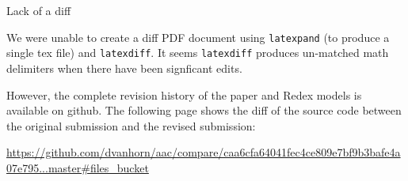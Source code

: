 \begin{titlepage}
%

\newpage
  \begin{center}
    \Large{Lack of a diff}
  \end{center}

We were unable to create a diff PDF document using \texttt{latexpand}
(to produce a single tex file) and \texttt{latexdiff}.  It seems
\texttt{latexdiff} produces un-matched math delimiters when there have
been signficant edits.

However, the complete revision history of the paper and Redex models
is available on github.  The following page shows the diff of the
source code between the original submission and the revised
submission:


\begin{center}
\url{https://github.com/dvanhorn/aac/compare/caa6cfa64041fec4ce809e7bf9b3bafe4a07e795...master#files_bucket}
\end{center}

\end{titlepage}
